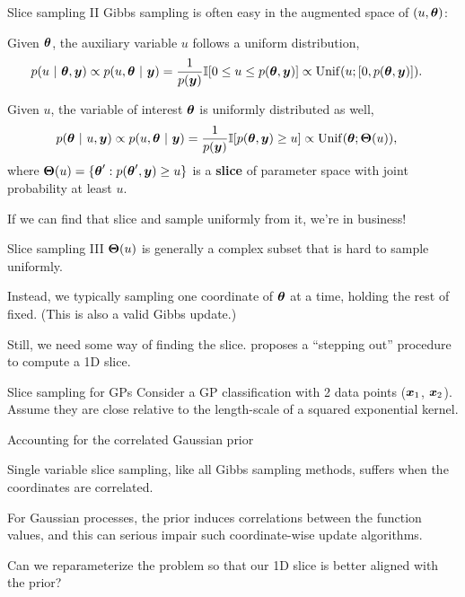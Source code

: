 \documentclass[aspectratio=169]{beamer}
\begin{document}
\begin{frame}{Slice sampling II}
    Gibbs sampling is often easy in the augmented space of $(u, \boldsymbol{\theta})$:
    
    Given $\boldsymbol{\theta}$, the auxiliary variable $u$ follows a uniform distribution,
    \begin{align}
        p(u ~\vert~ \boldsymbol{\theta}, \boldsymbol{y}) &\propto p(u, \boldsymbol{\theta} ~\vert~ \boldsymbol{y}) 
        = \frac{1}{p(\boldsymbol{y})} \mathbb{I}[0 \leq u \leq p(\boldsymbol{\theta}, \boldsymbol{y})]
        \propto \mathrm{Unif}(u; [0, p(\boldsymbol{\theta}, \boldsymbol{y})]).
    \end{align}
    
    Given $u$, the variable of interest $\boldsymbol{\theta}$ is uniformly distributed as well,
    \begin{align}
        p(\boldsymbol{\theta} ~\vert~ u, \boldsymbol{y}) &\propto p(u, \boldsymbol{\theta} ~\vert~ \boldsymbol{y}) 
        = \frac{1}{p(\boldsymbol{y})} \mathbb{I}[p(\boldsymbol{\theta}, \boldsymbol{y}) \geq u]
        \propto \mathrm{Unif}(\boldsymbol{\theta}; \boldsymbol{\Theta}(u)),
    \end{align}
    where $\boldsymbol{\Theta}(u) = \{\boldsymbol{\theta}': p(\boldsymbol{\theta}', \boldsymbol{y}) \geq u\}$ is a \textbf{slice} of parameter space with joint probability at least $u$.
    
    If we can find that slice and sample uniformly from it, we're in business!
    
\end{frame}

\begin{frame}{Slice sampling III}
    $\boldsymbol{\Theta}(u)$ is generally a complex subset that is hard to sample uniformly.
    
    Instead, we typically sampling one coordinate of $\boldsymbol{\theta}$ at a time, holding the rest of fixed. (This is also a valid Gibbs update.) 
    
    Still, we need some way of finding the slice. \citet{Neal2003-zu} proposes a ``stepping out'' procedure to compute a 1D slice.
\end{frame}

\begin{frame}[t]{Slice sampling for GPs}
    Consider a GP classification with 2 data points ($\boldsymbol{x}_1$, $\boldsymbol{x}_2$). Assume they are close relative to the length-scale of a squared exponential kernel.
\end{frame}

\begin{frame}{Accounting for the correlated Gaussian prior}

Single variable slice sampling, like all Gibbs sampling methods, suffers when the coordinates are correlated. 

For Gaussian processes, the prior induces correlations between the function values, and this can serious impair such coordinate-wise update algorithms. 

Can we reparameterize the problem so that our 1D slice is better aligned with the prior?
    
\end{frame}
\end{document}
